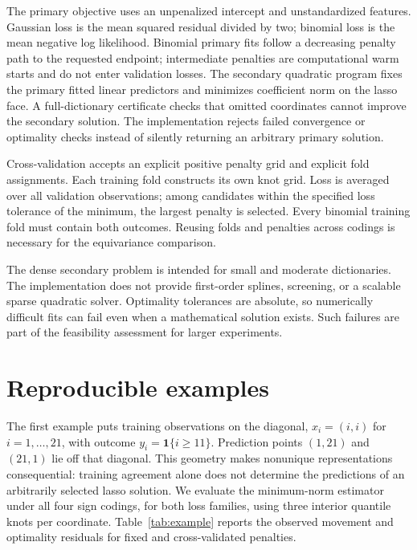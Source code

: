 \documentclass[11pt]{article}
\theoremstyle{definition}
\theoremstyle{remark}
\newcommand{\one}{\mathbf{1}}
\begin{document}
The primary objective uses an unpenalized intercept and unstandardized
features. Gaussian loss is the mean squared residual divided by two;
binomial loss is the mean negative log likelihood. Binomial primary fits
follow a decreasing penalty path to
the requested endpoint; intermediate penalties are computational warm starts
and do not enter validation losses. The secondary quadratic
program fixes the primary fitted linear predictors and minimizes coefficient
norm on the lasso face. A full-dictionary certificate checks that omitted
coordinates cannot improve the secondary solution. The implementation
rejects failed convergence or optimality checks instead of silently
returning an arbitrary primary solution.

Cross-validation accepts an explicit positive penalty grid and explicit
fold assignments. Each training fold constructs its own knot grid. Loss
is averaged over all validation observations; among candidates within the
specified loss tolerance of the minimum, the largest penalty is selected.
Every binomial training fold must contain both outcomes. Reusing folds and
penalties across codings is necessary for the equivariance comparison.

The dense secondary problem is intended for small and moderate dictionaries.
The implementation does not provide first-order splines, screening, or a
scalable sparse quadratic solver. Optimality tolerances are absolute, so
numerically difficult fits can fail even when a mathematical solution
exists. Such failures are part of the feasibility assessment for larger
experiments.

\section{Reproducible examples}\label{sec:examples}

The first example puts training observations on the diagonal,
$x_i=(i,i)$ for $i=1,\ldots,21$, with outcome
$y_i=\one\{i\ge11\}$. Prediction points $(1,21)$ and $(21,1)$ lie off
that diagonal. This geometry makes nonunique representations consequential:
training agreement alone does not determine the predictions of an
arbitrarily selected lasso solution. We evaluate the minimum-norm estimator
under all four sign codings, for both loss families, using three interior
quantile knots per coordinate. Table~\ref{tab:example} reports the observed
movement and optimality residuals for fixed and cross-validated penalties.


\end{document}
